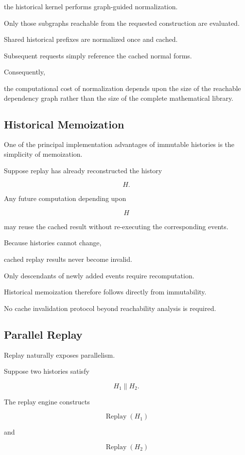 \documentclass[12pt,oneside]{article}
\theoremstyle{definition}
\theoremstyle{remark}
\DeclareMathOperator{\Replay}{Replay}
\begin{document}
the historical kernel performs graph-guided normalization.

Only those subgraphs reachable from the requested construction are evaluated.

Shared historical prefixes are normalized once and cached.

Subsequent requests simply reference the cached normal forms.

Consequently,

the computational cost of normalization depends upon the size of the reachable
dependency graph rather than the size of the complete mathematical library.

\subsection{Historical Memoization}

One of the principal implementation advantages of immutable histories is the
simplicity of memoization.

Suppose replay has already reconstructed the history

\[
H.
\]

Any future computation depending upon

\[
H
\]

may reuse the cached result without re-executing the corresponding events.

Because histories cannot change,

cached replay results never become invalid.

Only descendants of newly added events require recomputation.

Historical memoization therefore follows directly from immutability.

No cache invalidation protocol beyond reachability analysis is required.

\subsection{Parallel Replay}

Replay naturally exposes parallelism.

Suppose two histories satisfy

\[
H_1
\parallel
H_2.
\]

The replay engine constructs

\[
\Replay(H_1)
\]

and

\[
\Replay(H_2)
\]
\end{document}
